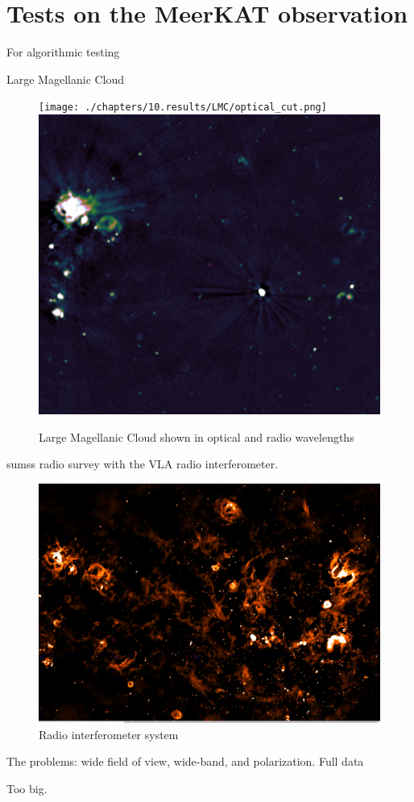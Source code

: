 \section{Tests on the MeerKAT observation}\label{results}
For algorithmic testing

Large Magellanic Cloud


\begin{figure}[h]
	\centering
	\texttt{[image: ./chapters/10.results/LMC/optical\_cut.png]}
	\includegraphics[width=0.40\linewidth]{./chapters/10.results/LMC/radio-843_cut.png}
	\caption{Large Magellanic Cloud shown in optical and radio wavelengths}
	\label{results:radio}
\end{figure}

\cite{bock1999sumss} sumss radio survey with the VLA radio interferometer.


	
\begin{figure}[h]
	\centering
	\includegraphics[width=0.80\linewidth]{./chapters/10.results/LMC/meerkat.png}
	\caption{Radio interferometer system}
	\label{results:radio}
\end{figure}

The problems: wide field of view, wide-band, and polarization. Full data

Too big.



